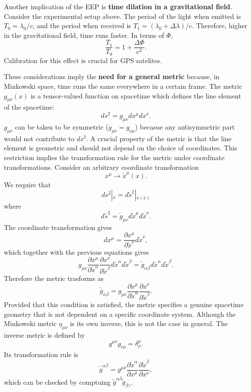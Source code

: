 \documentclass[11pt]{article}
\begin{document}
Another implication of the EEP is \textbf{time dilation in a gravitational field}.
Consider the experimental setup above.
The period of the light when emitted is $T_0 = \lambda_0/c$, and the period when received is $T_1 = (\lambda_0 + \Delta \lambda)/c$.
Therefore, higher in the gravitational field, time runs faster.
In terms of $\Phi$,
$$ \frac{T_1}{T_0} = 1 + \frac{\Delta \Phi}{c^2}. $$
Calibration for this effect is crucial for GPS satelites.

These considerations imply the \textbf{need for a general metric} because, in Minkowski space, time runs the same everywhere in a certain frame.
The metric $g_{\mu \nu}(x)$ is a tensor-valued function on spacetime which defines the line element of the spacetime:
$$ ds^2 = g_{\mu \nu} dx^\mu dx^\nu. $$
$g_{\mu \nu}$ can be taken to be symmetric ($g_{\mu \nu} = g_{\nu \mu}$) becasue any antisymmetric part would not contribute to $ds^2$.
A crucial property of the metric is that the line element is geometric and should not depend on the choice of coordinates.
This restriction implies the transformation rule for the metric under coordinate transformations.
Consider an arbitrary coordinate transformation
$$ x^\mu \rightarrow \tilde{x}^\mu(x). $$
We require that
$$ ds^2|{}_x = d\tilde{s}^2|{}_{\tilde{x}(x)} $$
where
$$ d\tilde{s}^2 = \tilde{g}_{\mu \nu} d\tilde{x}^\mu d\tilde{x}^\nu. $$
The coordinate transformation gives 
$$ dx^\mu = \frac{\partial x^\mu}{\partial \tilde{x}^\nu} d\tilde{x}^\nu, $$
which together with the previous equations gives
$$ g_{\mu \nu} \frac{\partial x^\mu}{\partial \tilde{x}^\alpha} \frac{\partial x^\nu}{\partial \tilde{x}^\beta} d\tilde{x}^\alpha d\tilde{x}^\beta = \tilde{g}_{\alpha \beta} d\tilde{x}^\alpha d\tilde{x}^\beta. $$
Therefore the metric trasforms as
$$ \tilde{g}_{\alpha \beta} = g_{\mu \nu} \frac{\partial x^\mu}{\partial \tilde{x}^\alpha} \frac{\partial x^\nu}{\partial \tilde{x}^\beta}. $$
Provided that this condition is satisfied, the metric specifies a genuine spacetime geometry that is not dependent on a specific coordinate system.
Although the Minkowski metric $\eta_{\mu \nu}$ is its own inverse, this is not the case in general.
The inverse metric is defined by
$$ g^{\mu \nu} g_{\nu \rho} = \delta^\mu_\rho. $$
Its transformation rule is
$$ \tilde{g}^{\alpha \beta} = g^{\mu \nu} \frac{\partial \tilde{x}^\alpha}{\partial x^\mu} \frac{\partial \tilde{x}^\beta}{\partial x^\nu}, $$
which can be checked by comptuing $\tilde{g}^{\alpha \beta} \tilde{g}_{\beta \gamma}$.
\end{document}
